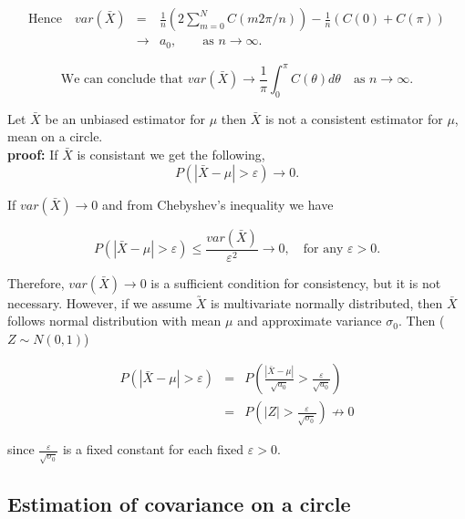 \begin{eqnarray*}
	\mbox{Hence} \quad	var(\bar{X}) &=& \frac{1}{n} \left(2 \sum_{m=0}^{N}C(m 2\pi/n)\right) - \frac{1}{n}(C(0) + C(\pi)) \\
	&\to & a_0, \quad \quad \mbox{as $n \to \infty$}.
\end{eqnarray*}

 
\[
	\mbox{We can conclude that }	var(\bar{X}) \to \frac{1}{\pi} \int_0^\pi C(\theta)d\theta \quad \mbox{as $n \to \infty$}.  
\]


\begin{prop}

  Let $\bar{X}$ be an unbiased estimator for $\mu$ then $\bar{X}$ is not a consistent estimator for $\mu$, mean on a circle. \\
  
  {\bf proof:}
	If $\bar{X}$ is consistant we get the following, 
	\[
		P(|\bar{X} - \mu| > \varepsilon) \to 0.
	\]

	If $var(\bar{X}) \to 0$ and from Chebyshev's inequality we have

	\[
		P(|\bar{X} - \mu| > \varepsilon) \le \frac{var(\bar{X})}{\varepsilon^2} \to 0, \quad \mbox{for any $\varepsilon > 0$}.
	\]

	Therefore, $var(\bar{X}) \to 0$ is a sufficient condition for consistency, but it is not necessary. However, if we assume $\utilde{X}$ is multivariate normally distributed, then $\bar{X}$ follows normal distribution with mean $\mu$ and approximate variance $\sigma_0$. Then ($Z \sim N(0, 1)$)
	 
	 \begin{eqnarray*}
		P(|\bar{X} - \mu| > \varepsilon) &=& P\left(\frac{|\bar{X} - \mu|}{\sqrt{a_0}} > \frac{\varepsilon}{\sqrt{a_0}}\right) \\
		&=& P\left(|Z| > \frac{\varepsilon}{\sqrt{\sigma_0}}\right) \not\to 0  
	\end{eqnarray*}
	
	since $\frac{\varepsilon}{\sqrt{\sigma_0}}$ is a fixed constant for each fixed $\varepsilon > 0$.\\
	
\end{prop}

\subsection{Estimation of covariance on a circle} \label{est_covariance}

